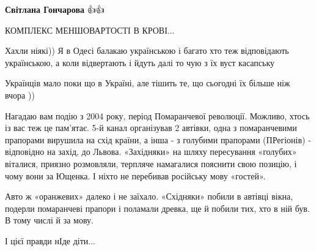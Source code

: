 \begin{itemize}
\begin{itemize}
\textbf{Світлана Гончарова} 👍👍

\end{itemize}

 
КОМПЛЕКС МЕНШОВАРТОСТІ В КРОВІ...

 

Хахли ніякі)) Я в Одесі балакаю українською і багато хто теж відповідають
українською, а коли відвертають і йдуть далі то чую з їх вуст касапську


 
Українців мало поки що в Україні, але тішить те, що сьогодні їх більше ніж вчора ))

 

Нагадаю вам подію з 2004 року, період Помаранчевої революції. Можливо, хтось із
вас теж це пам’ятає. 5-й канал організував 2 автівки, одна з помаранчевими
прапорами вирушила на схід країни, а інша - з голубими прапорами (ПРегіонів) -
відповідно на захід, до Львова. «Західняки» на шляху пересування «голубих»
віталися, приязно розмовляли, терпляче намагалися пояснити свою позицію, і чому
вони за Ющенка. І ніхто не перебивав російську мову «гостей».

Авто ж «оранжевих» далеко і не заїхало. «Східняки» побили в автівці вікна,
подерли помаранчеві прапори і поламали древка, ще й побили тих, хто в ній був.
В тому числі й за мову.

І цієї правди нІде діти...

 


\end{itemize}
